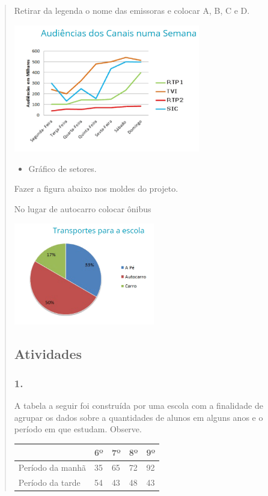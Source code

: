 \begin{enumerate}
\begin{escolha}
\begin{enumerate}
\begin{itemize}
\begin{itemize}
\begin{escolha}
\begin{quote}
\begin{escolha}
{Retirar da legenda o nome das emissoras e colocar A, B, C e D.

\includegraphics[width=3.19872in,height=2.19483in]{media/image93.png}

\begin{itemize}
\item
  Gráfico de setores.
\end{itemize}

Fazer a figura abaixo nos moldes do projeto.

No lugar de autocarro colocar ônibus

\includegraphics[width=2.42308in,height=1.74971in]{media/image94.png}

\subsection{Atividades}\label{atividades-7}

\subsubsection{1.}\label{section-91}

A tabela a seguir foi construída por uma escola com a finalidade de agrupar os
dados sobre a quantidades de alunos em alguns anos e o período em que
estudam. Observe.

\begin{longtable}[]{@{}lllll@{}}
\toprule
& 6º & 7º & 8º & 9º\tabularnewline
\midrule
\endhead
Período da manhã & 35 & 65 & 72 & 92\tabularnewline
Período da tarde & 54 & 43 & 48 & 43\tabularnewline
\bottomrule
\end{longtable}

}
\end{escolha}
\end{quote}
\end{escolha}
\end{itemize}
\end{itemize}
\end{enumerate}
\end{escolha}
\end{enumerate}

